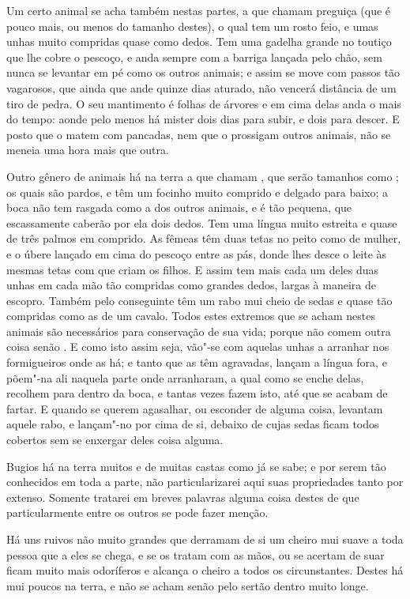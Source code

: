 Um certo animal se acha também nestas partes, a que chamam preguiça (que		%
é pouco mais, ou menos do tamanho destes), o qual tem um rosto feio, e
umas unhas muito compridas quase como dedos. Tem uma gadelha grande no
toutiço que lhe cobre o pescoço, e anda sempre com a barriga lançada
pelo chão, sem nunca se levantar em pé como os outros animais; e assim
se move com passos tão vagarosos, que ainda que ande quinze dias
aturado, não vencerá distância de um tiro de pedra. O seu mantimento é
folhas de árvores e em cima delas anda o mais do tempo: aonde pelo menos
há mister dois dias para subir, e dois para descer. E posto que o matem
com pancadas, nem que o prossigam outros animais, não se meneia uma hora
mais que outra.

Outro gênero de animais há na terra a que chamam , que serão
tamanhos como ; os quais são pardos, e têm um focinho muito
comprido e delgado para baixo; a boca não tem rasgada como a dos outros
animais, e é tão pequena, que escassamente caberão por ela dois dedos.
Tem uma língua muito estreita e quase de três palmos em comprido. As
fêmeas têm duas tetas no peito como de mulher, e o úbere lançado em cima
do pescoço entre as pás, donde lhes desce o leite às mesmas tetas com
que criam os filhos. E assim tem mais cada um deles duas unhas em cada
mão tão compridas como grandes dedos, largas à maneira de escopro.
Também pelo conseguinte têm um rabo mui cheio de sedas e quase tão
compridas como as de um cavalo. Todos estes extremos que se acham		%
nestes animais são necessários para conservação de sua vida; porque
não comem outra coisa senão . E como isto assim seja, vão"-se com
aquelas unhas a arranhar nos formigueiros onde as há; e tanto que as
têm agravadas, lançam a língua fora, e põem"-na ali naquela parte onde
arranharam, a qual como se enche delas, recolhem para dentro da boca, e
tantas vezes fazem isto, até que se acabam de fartar. E quando se
querem agasalhar, ou esconder de alguma coisa, levantam aquele rabo, e
lançam"-no por cima de si, debaixo de cujas sedas ficam todos cobertos \EP[1]
sem se enxergar deles coisa alguma.

Bugios há na terra muitos e de muitas castas como já se sabe; e por		%
serem tão conhecidos em toda a parte, não particularizarei aqui suas
propriedades tanto por extenso. Somente tratarei em breves palavras
alguma coisa destes de que particularmente entre os outros se pode fazer
\mbox{menção.}

Há uns ruivos não muito grandes que derramam de si um  cheiro mui suave
a toda pessoa que a eles se chega, e se os tratam com as mãos, ou se
acertam de suar ficam muito mais odoríferos e alcança o cheiro a todos
os circunstantes. Destes há mui poucos na terra, e não se acham senão
pelo sertão dentro muito longe.

